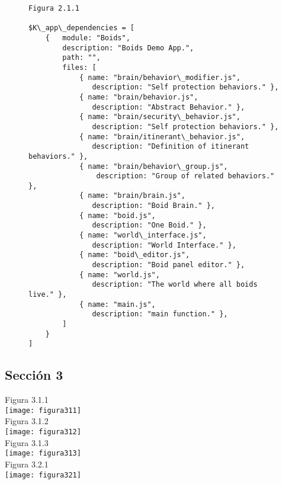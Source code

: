 \begin{figure}
\begin{verbatim}
Figura 2.1.1

$K\_app\_dependencies = [
    {   module: "Boids", 
        description: "Boids Demo App.",
        path: "",
        files: [
            { name: "brain/behavior\_modifier.js",  
               description: "Self protection behaviors." },
            { name: "brain/behavior.js",           
               description: "Abstract Behavior." },
            { name: "brain/security\_behavior.js",  
               description: "Self protection behaviors." },
            { name: "brain/itinerant\_behavior.js", 
               description: "Definition of itinerant behaviors." },
            { name: "brain/behavior\_group.js",     
                description: "Group of related behaviors." },
            { name: "brain/brain.js",              
               description: "Boid Brain." },
            { name: "boid.js",                     
               description: "One Boid." },
            { name: "world\_interface.js",          
               description: "World Interface." },
            { name: "boid\_editor.js",              
               description: "Boid panel editor." },
            { name: "world.js",                    
               description: "The world where all boids live." },
            { name: "main.js",                     
               description: "main function." },
        ]
    }
]
\end{verbatim}
\end{figure}


\subsection{Sección 3}
\label{subsubsection:seccion3}

Figura 3.1.1\\
\texttt{[image: figura311]}\\

Figura 3.1.2\\
\texttt{[image: figura312]}\\

Figura 3.1.3\\
\texttt{[image: figura313]}\\


Figura 3.2.1\\
\texttt{[image: figura321]}\\

